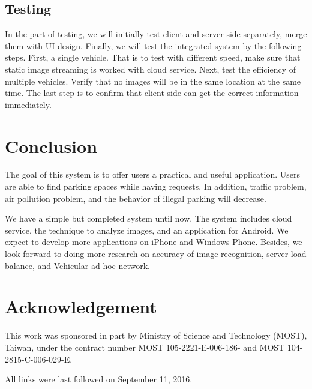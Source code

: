 \documentclass[runningheads,a4paper]{llncs}
\begin{document}
\subsection{Testing}

In the part of testing, we will initially test client and server side
separately, merge them with UI design. Finally, we will test
the integrated system by the following steps. First, a single vehicle.
That is to test with different speed, make sure that static image
streaming is worked with cloud service. Next, test the efficiency of
multiple vehicles. Verify that no images will be in the same
location at the same time. The last step is to confirm that client side
can get the correct information immediately.

\section{Conclusion}\label{sec:conclusion}

The goal of this system is to offer users a practical and useful
application. Users are able to find parking spaces while having
requests. In addition, traffic problem, air pollution problem, and the
behavior of illegal parking will decrease.

We have a simple but completed system until now. The system includes
cloud service, the technique to analyze images, and an application for
Android. We expect to develop more applications on iPhone and Windows
Phone. Besides, we look forward to doing more research on accuracy of
image recognition, server load balance, and Vehicular ad hoc network.

\section{Acknowledgement}\label{sec:ack}

This work was sponsored in part by Ministry of Science and Technology
(MOST), Taiwan, under the contract number MOST 105-2221-E-006-186- and
MOST 104-2815-C-006-029-E.





All links were last followed on September 11, 2016.
\end{document}
